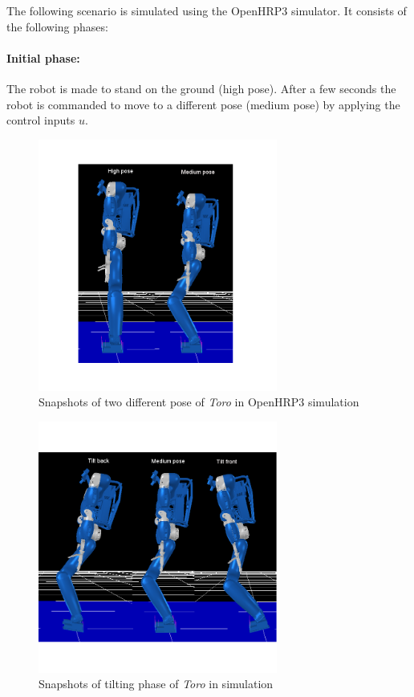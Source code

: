 The following scenario is simulated using the OpenHRP3 simulator. It consists of the following phases:

\paragraph{Initial phase:} The robot is made to stand on the ground (high pose). After a few seconds the robot is commanded to move to a different pose (medium pose) by applying the control inputs $u$. 

\begin{figure}
	\centering
	\includegraphics[width=0.7\textwidth,height=0.4\textheight]{Bilder/toro_high_medium.png}
	\caption{Snapshots of two different pose of \emph{Toro} in OpenHRP3 simulation}
	\label{fig:toro_sim_high_low}
\end{figure}
\begin{figure}
	\centering
	\includegraphics[width=0.7\textwidth, height=0.4\textheight]{Bilder/toro_tiltphase.png}
	\caption{Snapshots of tilting phase of \emph{Toro} in simulation}
	\label{fig:toro_tiltphase}
\end{figure}

